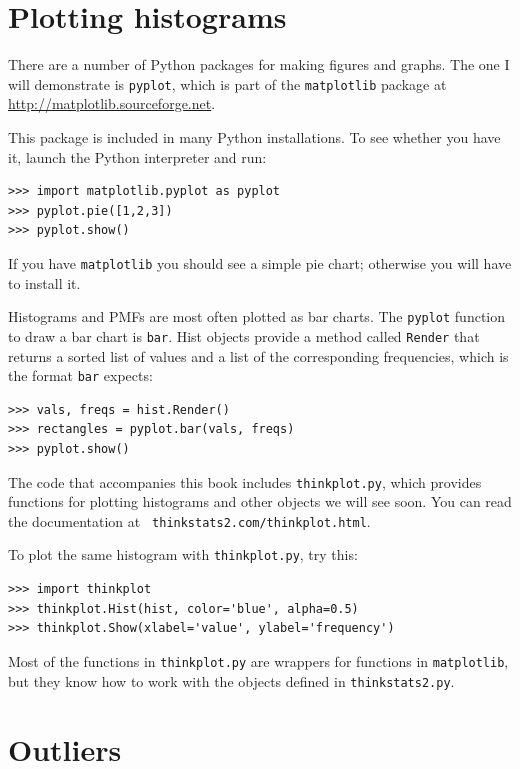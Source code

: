 \documentclass[12pt]{book}
\begin{document}
\section{Plotting histograms}

There are a number of Python packages for making figures and graphs.
The one I will demonstrate is {\tt pyplot}, which is part of
the {\tt matplotlib} package at \url{http://matplotlib.sourceforge.net}.

This package is included in many Python installations.  To see whether
you have it, launch the Python interpreter and run:
%
\begin{verbatim}
>>> import matplotlib.pyplot as pyplot
>>> pyplot.pie([1,2,3])
>>> pyplot.show()
\end{verbatim}

If you have {\tt matplotlib} you should see a simple pie chart;
otherwise you will have to install it.

Histograms and PMFs are most often plotted as bar charts.  The
{\tt pyplot} function to draw a bar chart is {\tt bar}.  Hist
objects provide a method called {\tt Render} that returns a sorted
list of values and a list of the corresponding frequencies, which
is the format {\tt bar} expects:
%
\begin{verbatim}
>>> vals, freqs = hist.Render()
>>> rectangles = pyplot.bar(vals, freqs)
>>> pyplot.show()
\end{verbatim}

The code that accompanies this book includes
{\tt thinkplot.py}, which provides functions
for plotting histograms and other objects we will see soon.
You can read the documentation at {\tt
  thinkstats2.com/thinkplot.html}. 

To plot the same histogram with {\tt thinkplot.py}, try this:

\begin{verbatim}
>>> import thinkplot
>>> thinkplot.Hist(hist, color='blue', alpha=0.5)
>>> thinkplot.Show(xlabel='value', ylabel='frequency')
\end{verbatim}

Most of the functions in {\tt thinkplot.py} are wrappers for
functions in {\tt matplotlib}, but they know how to work with
the objects defined in {\tt thinkstats2.py}.


\section{Outliers}
\end{document}
